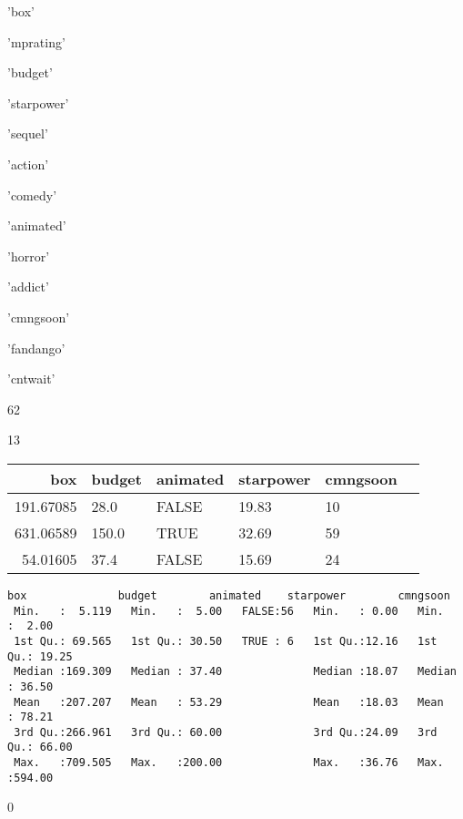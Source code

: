 \documentclass[11pt]{article}
\begin{document}
    
    \begin{enumerate*}
\item 'box'
\item 'mprating'
\item 'budget'
\item 'starpower'
\item 'sequel'
\item 'action'
\item 'comedy'
\item 'animated'
\item 'horror'
\item 'addict'
\item 'cmngsoon'
\item 'fandango'
\item 'cntwait'
\end{enumerate*}


    
    62

    
    13

    
    \begin{tabular}{r|lllll}
 box & budget & animated & starpower & cmngsoon\\
\hline
	 191.67085 &  28.0     & FALSE     & 19.83     & 10       \\
	 631.06589 & 150.0     & TRUE      & 32.69     & 59       \\
	  54.01605 &  37.4     & FALSE     & 15.69     & 24       \\
\end{tabular}


    
    
    \begin{Verbatim}[commandchars=\\\{\}]
      box              budget        animated    starpower        cmngsoon     
 Min.   :  5.119   Min.   :  5.00   FALSE:56   Min.   : 0.00   Min.   :  2.00  
 1st Qu.: 69.565   1st Qu.: 30.50   TRUE : 6   1st Qu.:12.16   1st Qu.: 19.25  
 Median :169.309   Median : 37.40              Median :18.07   Median : 36.50  
 Mean   :207.207   Mean   : 53.29              Mean   :18.03   Mean   : 78.21  
 3rd Qu.:266.961   3rd Qu.: 60.00              3rd Qu.:24.09   3rd Qu.: 66.00  
 Max.   :709.505   Max.   :200.00              Max.   :36.76   Max.   :594.00  
    \end{Verbatim}

    
    0

    
    \begin{center}
    \end{center}
    { \hspace*{\fill} \\}
    
\end{document}
